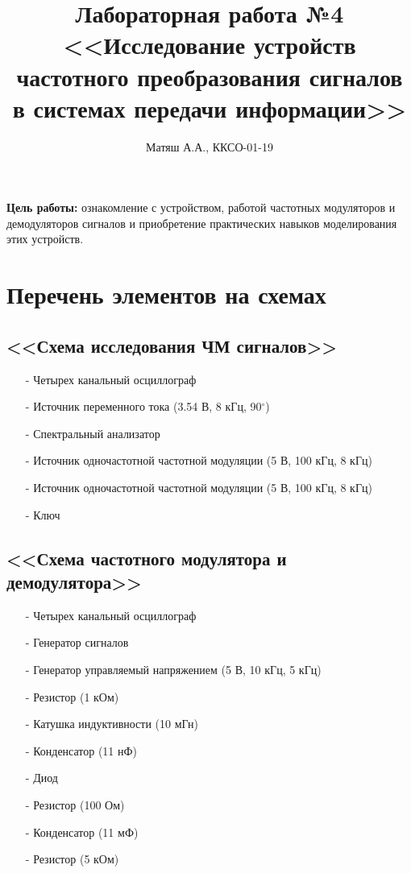 \documentclass[11pt]{article}
\title{\textbf{Лабораторная работа №4\\
<<Исследование устройств частотного преобразования сигналов в системах передачи информации>>}}
\author{Матяш А.А., ККСО-01-19}
\date{}
\begin{document}
\maketitle
\thispagestyle{empty}
\textbf{Цель работы:} ознакомление с устройством, работой частотных модуляторов и демодуляторов сигналов и приобретение практических навыков моделирования этих устройств. 
\section{Перечень элементов на схемах}
\subsection{<<Схема исследования ЧМ сигналов>>}
\begin{itemize}
    \item[-] Четырех канальный осциллограф
    \item[-] Источник переменного тока (3.54 В, 8 кГц, 90$^{\circ}$)
    \item[-] Спектральный анализатор
    \item[-] Источник одночастотной частотной модуляции (5 В, 100 кГц, 8 кГц)
    \item[-] Источник одночастотной частотной модуляции (5 В, 100 кГц, 8 кГц)
    \item[-] Ключ
\end{itemize}
\subsection{<<Схема частотного модулятора и демодулятора>>}
\begin{itemize}
    \item[-] Четырех канальный осциллограф
    \item[-] Генератор сигналов
    \item[-] Генератор управляемый напряжением (5 В, 10 кГц, 5 кГц)
    \item[-] Резистор (1 кОм)
    \item[-] Катушка индуктивности (10 мГн)
    \item[-] Конденсатор (11 нФ)
    \item[-] Диод
    \item[-] Резистор (100 Ом)
    \item[-] Конденсатор (11 мФ)
    \item[-] Резистор (5 кОм)
\end{itemize}
\end{document}
